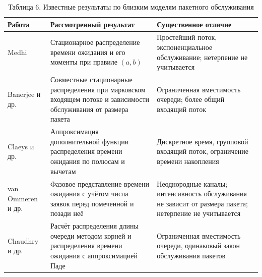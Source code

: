 \begin{table}[htbp]
\centering\small
\caption{Таблица 6. Известные результаты по близким моделям пакетного обслуживания}
\begin{tabular}{p{.22\linewidth}p{.36\linewidth}p{.34\linewidth}}
\hline
Работа & Рассмотренный результат & Существенное отличие \\\hline
Medhi~\cite{medhi1975} & Стационарное распределение времени ожидания и его моменты при правиле $(a,b)$ & Простейший поток, экспоненциальное обслуживание; нетерпение не учитывается \\
Banerjee и др.~\cite{banerjee2015} & Совместные стационарные распределения при марковском входящем потоке и зависимости обслуживания от размера пакета & Ограниченная вместимость очереди; более общий входящий поток \\
Claeys и др.~\cite{claeys2013} & Аппроксимация дополнительной функции распределения времени ожидания по полюсам и вычетам & Дискретное время, групповой входящий поток, ограничение времени накопления \\
van Ommeren и др.~\cite{vanommer2020} & Фазовое представление времени ожидания с учётом числа заявок перед помеченной и позади неё & Неоднородные каналы; интенсивность обслуживания не зависит от размера пакета; нетерпение не учитывается \\
Chaudhry и др.~\cite{chaudhry2023} & Расчёт распределения длины очереди методом корней и распределения времени ожидания с аппроксимацией Паде & Ограниченная вместимость очереди, одинаковый закон обслуживания пакетов \\
\hline
\end{tabular}
\end{table}

